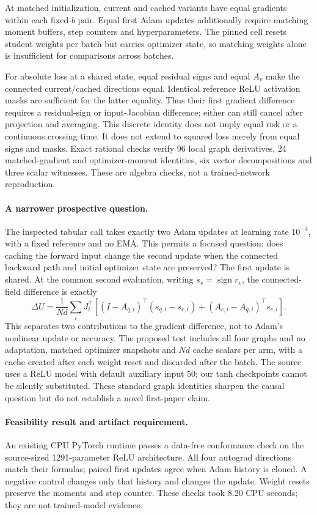 \documentclass[11pt,a4paper]{article}
\begin{document}
At matched initialization, current and cached variants have equal gradients
within each fixed-$b$ pair. Equal first Adam updates additionally require
matching moment buffers, step counters and hyperparameters. The pinned
cell resets student weights per batch but carries optimizer state, so
matching weights alone is insufficient for comparisons across batches.

For absolute loss at a shared state, equal residual signs and equal $A_v$
make the connected current/cached directions equal. Identical reference
ReLU activation masks are sufficient for the latter equality. Thus their
first gradient difference requires a residual-sign or input-Jacobian
difference; either can still cancel after projection and averaging.
This discrete identity does not imply equal risk or a continuous crossing
time. It does not extend to squared loss merely from equal signs and masks.
Exact rational checks verify 96 local graph derivatives, 24 matched-gradient
and optimizer-moment identities, six vector decompositions and three scalar
witnesses. These are algebra checks, not a trained-network reproduction.

\paragraph{A narrower prospective question.}
The inspected tabular call takes exactly two Adam updates at learning rate
$10^{-4}$, with a fixed reference and no EMA. This permits a focused question:
does caching the forward input change the second update when the connected
backward path and initial optimizer state are preserved? The first update
is shared. At the common second evaluation, writing $s_v=\operatorname{sign}r_v$,
the connected-field difference is exactly
\[
 \Delta U=\frac1{Nd}\sum_iJ_i^\top\left[
 (I-A_{q,i})^\top(s_{q,i}-s_{c,i})
 +(A_{c,i}-A_{q,i})^\top s_{c,i}\right].
\]
This separates two contributions to the gradient difference, not to Adam's
nonlinear update or accuracy. The proposed test includes all four graphs
and no adaptation, matched optimizer snapshots and $Nd$ cache scalars per
arm, with a cache created after each weight reset and discarded after the
batch. The source uses a ReLU model with default auxiliary input 50;
our tanh checkpoints cannot be silently substituted. These standard graph
identities sharpen the causal question but do not establish a novel
first-paper claim.

\paragraph{Feasibility result and artifact requirement.}
An existing CPU PyTorch runtime passes a data-free conformance check on
the source-sized 1291-parameter ReLU architecture. All four autograd
directions match their formulas; paired first updates agree when Adam
history is cloned. A negative control changes only that history and
changes the update. Weight resets preserve the moments and step counter.
These checks took 8.20 CPU seconds; they are not trained-model evidence.
\end{document}
